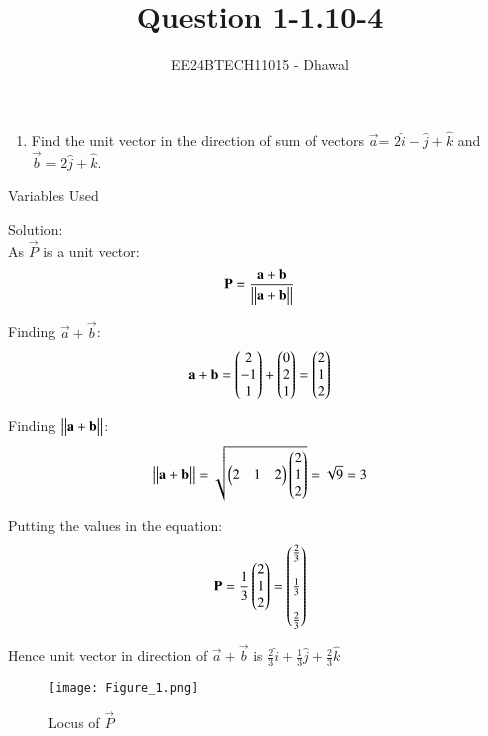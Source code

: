 \documentclass[journal]{IEEEtran}
\numberwithin{equation}{enumi}
\numberwithin{figure}{enumi}
\begin{document}

\title{Question 1-1.10-4}
\author{EE24BTECH11015 - Dhawal}
{\let\newpage\relax\maketitle}
\begin{enumerate}
\item Find the unit vector in the direction of sum of vectors $\vec{a}$= $2\hat{i}-\hat{j}+\hat{k}$  and  $\vec{b}=2\hat{j}+\hat{k}$.

\end{enumerate}

\begin{table}[h!]    
  \centering
  
  \caption{Variables Used}
  \label{tab 1.4.9.2}
\end{table}
Solution:\\

As $\vec{P}$ is a unit vector:
\begin{align}
        \mathbf{P}=\frac{\mathbf{a}+\mathbf{b}}{\begin{vmatrix}\begin{vmatrix}\mathbf{a}+\mathbf{b}\end{vmatrix}\end{vmatrix}}
\end{align}

Finding $\vec{a}+\vec{b}$:
\begin{align}
        \mathbf{a}+\mathbf{b}=\begin{pmatrix}2\\ -1 \\ 1\end{pmatrix}+ \begin{pmatrix}0\\2\\1\end{pmatrix}=\begin{pmatrix}2\\1\\2\end{pmatrix}
\end{align}

Finding ${\begin{vmatrix}\begin{vmatrix}\mathbf{a}+\mathbf{b}\end{vmatrix}\end{vmatrix}}$:
\begin{align}
        {\ensuremath{\begin{vmatrix}\begin{vmatrix}\mathbf{a}+\mathbf{b}\end{vmatrix}\end{vmatrix}}}= \sqrt{\begin{pmatrix}2&1&2\end{pmatrix}\begin{pmatrix}2\\1\\2\end{pmatrix}}=
        \sqrt{9}=3
\end{align}

Putting the values in the equation:
    \begin{align}
         \mathbf{P}=\frac{1}{3}\begin{pmatrix}2\\1\\2\end{pmatrix}=\begin{pmatrix}\frac{2}{3}\\\\\frac{1}{3}\\\\\frac{2}{3}\end{pmatrix}
    \end{align}

Hence unit vector in direction of $\vec{a}+\vec{b}$ is $\frac{2}{3} \hat{i}+ \frac{1}{3}\hat{j}+\frac{2}{3}\hat{k}$
\begin{figure}[h!]
   \centering
   \texttt{[image: Figure\_1.png]}
	\caption{Locus of $\vec{P}$ }
   \label{stemplot}
\end{figure}
\end{document}
